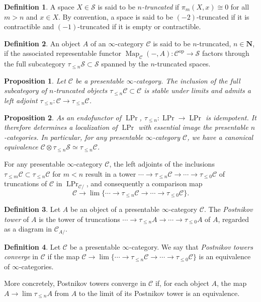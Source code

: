 \documentclass{article}
\newtheorem{proposition}{Proposition}[subsection]
\theoremstyle{definition}
\newtheorem{definition}{Definition}[subsection]
\newcommand{\C}{\mathcal{C}}
\renewcommand{\S}{\mathcal{S}}
\newcommand{\NN}{\mathbf{N}}
\renewcommand{\i}{\infty}
\newcommand{\too}{\longrightarrow}
\newcommand{\op}{\mathrm{op}}
\DeclareMathOperator{\Map}{Map}
\DeclareMathOperator{\PrL}{LPr}
\begin{document}
\begin{definition}
A space $X\in\S$ is said to be {\em $n$-truncated}  if 
$
\pi_m(X,x)\cong 0
$
for all  $m>n$ and  $x\in X$.
By convention, a space is said to be $(-2)$-truncated if it is contractible and $(-1)$-truncated if it is empty or contractible.
\end{definition}

\begin{definition}\label{def:ntrunc}
An object $A$ of an $\i$-category $\C$ is said to be $n$-truncated, $n\in\NN$,
if the associated representable functor $\Map_\C(-,A):\C^{\op}\to\S$
factors through the full subcategory $\tau_{\leq n}\S\subset\S$ spanned by the $n$-truncated spaces.
\end{definition}
\begin{proposition}{\em \cite[Proposition 5.5.6.18]{HTT}}
Let $\C$ be a presentable $\i$-category.
The inclusion of the full subcategory of $n$-truncated objects $\tau_{\leq n}\C\subset\C$ is stable under limits and admits a left adjoint $\tau_{\leq n}:\C\to\tau_{\leq n}\C$.
\end{proposition}

\begin{proposition}{\em \cite[Example 4.8.1.22]{HA}}
As an endofunctor of $\PrL$, $\tau_{\leq n}:\PrL\to\PrL$ is idempotent.
It therefore determines a localization of $\PrL$ with essential image the presentable $n$-categories.
In particular, for any presentable $\infty$-category $\C$, we have a canonical equivalence 
$\C\otimes\tau_{\leq n}\S\simeq\tau_{\leq n}\C$.
\end{proposition}

For any presentable $\infty$-category $\C$, the left adjoints of the inclusions $\tau_{\leq m}\C\subset\tau_{\leq n}\C$ for $m<n$ result in a tower
$
\cdots\to\tau_{\leq n}\C\to\cdots\to\tau_{\leq 0}\C
$
of truncations of $\C$ in $\PrL_{\C/}$, and consequently a comparison map
\[
\C\too\lim\{\cdots\to\tau_{\leq n}\C\to\cdots\to\tau_{\leq 0}\C\}.
\]
\begin{definition}
Let $A$ be an object of a presentable $\i$-category $\C$.
The {\em Postnikov tower} of $A$ is the tower of truncations $\cdots\to\tau_{\leq n}A\to\cdots\to\tau_{\leq 0}A$ of $A$, regarded as a diagram in $\C_{A/}$.
\end{definition}
\begin{definition}
Let $\C$ be a presentable $\i$-category.
We say that {\em Postnikov towers converge} in $\C$ if the map $\C\to\lim\{\cdots\to\tau_{\leq n}\C\to\cdots\to\tau_{\leq 0}\C\}$ is an equivalence of $\infty$-categories.
\end{definition}
More concretely, Postnikov towers converge in $\C$ if, for each object $A$, the map $A\to\lim\tau_{\leq n}A$ from $A$ to the limit of its Postnikov tower is an equivalence.
\end{document}
